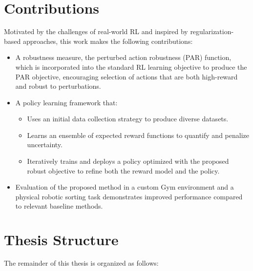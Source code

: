 \documentclass[./dissertation.tex]{subfiles}
\begin{document}
\section{Contributions}
Motivated by the challenges of real-world RL and inspired by regularization-based approaches, this work makes the following contributions:
\begin{itemize}
    \item A robustness measure, the perturbed action robustness (PAR) function, which is incorporated into the standard RL learning objective to produce the PAR objective, encouraging selection of actions that are both high-reward and robust to perturbations.
    \item A policy learning framework that:
    \begin{itemize}
        \item Uses an initial data collection strategy to produce diverse datasets.
        \item Learns an ensemble of expected reward functions to quantify and penalize uncertainty.
        \item Iteratively trains and deploys a policy optimized with the proposed robust objective to refine both the reward model and the policy.
    \end{itemize}
    \item Evaluation of the proposed method in a custom Gym environment and a physical robotic sorting task demonstrates improved performance compared to relevant baseline methods. 
\end{itemize}

\section{Thesis Structure}

The remainder of this thesis is organized as follows:
\end{document}
